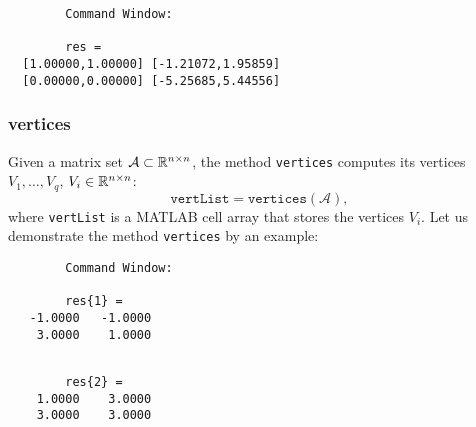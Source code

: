 \begin{center}
\begin{minipage}[t]{0.35\textwidth}
	\vspace{10pt}
	\footnotesize
	
\end{minipage}
\begin{minipage}[t]{0.5\textwidth}
	\vspace{10pt}
	\begin{verbatim}
		Command Window:	
	
		res = 
  [1.00000,1.00000] [-1.21072,1.95859]
  [0.00000,0.00000] [-5.25685,5.44556]
	\end{verbatim}
\end{minipage}
\end{center}

\vspace{1cm}
\subsubsection{vertices} \label{sec:verticesMatSet}

Given a matrix set $\mathcal{A} \subset \mathbb{R}^{n \times n}$, the method \texttt{vertices} computes its vertices $V_1,\dots,V_q$, $V_i \in \mathbb{R}^{n \times n}$:
\begin{equation*}
	\texttt{vertList} = \texttt{vertices}(\mathcal{A}),
\end{equation*}
where \texttt{vertList} is a MATLAB cell array that stores the vertices $V_i$.
Let us demonstrate the method \texttt{vertices} by an example:

\begin{center}
\begin{minipage}[t]{0.35\textwidth}
	\vspace{10pt}
	\footnotesize
	
\end{minipage}
\begin{minipage}[t]{0.3\textwidth}
	\vspace{10pt}
	\begin{verbatim}
		Command Window:	
	
		res{1} = 
   -1.0000   -1.0000
    3.0000    1.0000

	\end{verbatim}
\end{minipage}
\begin{minipage}[t]{0.3\textwidth}
	\vspace{31pt}
	\begin{verbatim}
	
		res{2} = 
    1.0000    3.0000
    3.0000    3.0000

	\end{verbatim}
\end{minipage}
\end{center}
